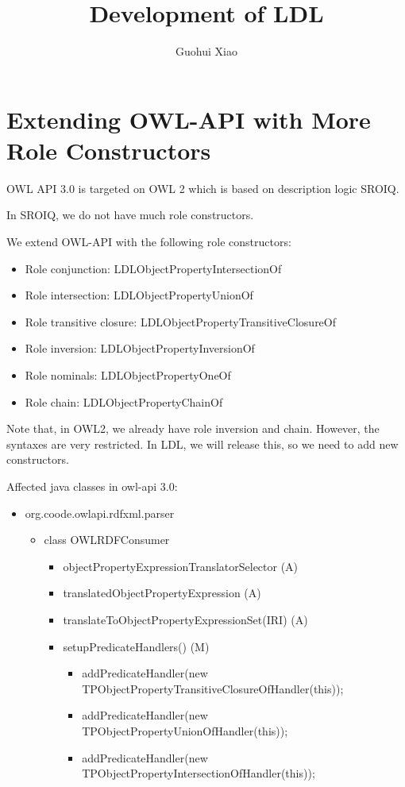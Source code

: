 \documentclass{article}
\begin{document}
\title{Development of LDL}

\author{Guohui Xiao}

\maketitle

\section{Extending OWL-API with More Role Constructors}

OWL API 3.0 is targeted on OWL 2 which is based on description logic
SROIQ.

In SROIQ, we do not have much role constructors.

We extend OWL-API
with the following role constructors:
\begin{itemize}
\item Role conjunction: LDLObjectPropertyIntersectionOf
\item Role intersection: LDLObjectPropertyUnionOf
\item Role transitive closure: LDLObjectPropertyTransitiveClosureOf
\item Role inversion: LDLObjectPropertyInversionOf
\item Role nominals: LDLObjectPropertyOneOf
\item Role chain: LDLObjectPropertyChainOf
\end{itemize}
 
 Note that, in OWL2, we already have role inversion
and chain. 
 However, the syntaxes are very restricted. 
 In LDL, we
will release this, so we need to add new constructors.
 
 Affected
java classes in owl-api 3.0:
 
\begin{itemize}
\item org.coode.owlapi.rdfxml.parser
  \begin{itemize}
  \item class OWLRDFConsumer 
    \begin{itemize}
    \item objectPropertyExpressionTranslatorSelector (A)
    \item translatedObjectPropertyExpression (A)
    \item translateToObjectPropertyExpressionSet(IRI) (A)
    \item setupPredicateHandlers() (M)
      \begin{itemize}
      \item addPredicateHandler(new
        TPObjectPropertyTransitiveClosureOfHandler(this));
      \item addPredicateHandler(new
        TPObjectPropertyUnionOfHandler(this));
      \item addPredicateHandler(new
        TPObjectPropertyIntersectionOfHandler(this));
 
      \end{itemize}
    \end{itemize}
  \end{itemize}
\end{itemize}
 
\end{document}

